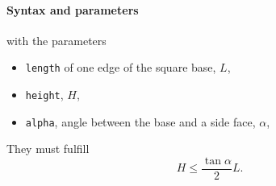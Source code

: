 \begin{figure}[h]
\hfill
{}
\hfill
{}
\hfill
{}
\hfill
\end{figure}

\FloatBarrier

\paragraph{Syntax and parameters}
\begin{quote}
\end{quote}
with the parameters
\begin{itemize}
\item \texttt{length} of one edge of the square base, $L$,  
\item \texttt{height}, $H$,
\item \texttt{alpha}, angle between the base and a side face, $\alpha$,
\end{itemize}
They must fulfill
\begin{displaymath}
  H \le \frac{\tan\alpha}{2}L.
\end{displaymath}


